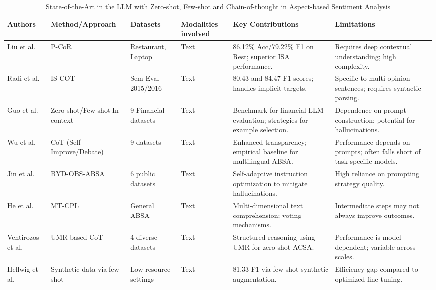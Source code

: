 \begin{landscape}
\begin{table}[p]
\centering
\caption{State-of-the-Art in the LLM with Zero-shot, Few-shot and Chain-of-thought in Aspect-based Sentiment Analysis}
\label{tab:llm-zero-few-cot-absa}
\small
\renewcommand{\arraystretch}{1.2}
\begin{tabularx}{\linewidth}{|p{1.8cm}|p{3cm}|p{3cm}|p{1.8cm}|X|X|}
\hline
Authors & Method/Approach & Datasets & Modalities involved & Key Contributions & Limitations \\ \hline
Liu et al.  \parencite{chang_liu_7bb298f7} & P-CoR & Restaurant, Laptop & Text & 86.12\% Acc/79.22\% F1 on Rest; superior ISA performance. & Requires deep contextual understanding; high complexity. \\ \hline
Radi et al.  \parencite{mohammad_radi_96ee5847} & IS-COT & Sem-Eval 2015/2016 & Text & 80.43 and 84.47 F1 scores; handles implicit targets. & Specific to multi-opinion sentences; requires syntactic parsing. \\ \hline
Guo et al.  \parencite{yue_guo_642efc19} & Zero-shot/Few-shot In-context & 9 Financial datasets & Text & Benchmark for financial LLM evaluation; strategies for example selection. & Dependence on prompt construction; potential for hallucinations. \\ \hline
Wu et al.  \parencite{chengyan_wu_4c659eab} & CoT (Self-Improve/Debate) & 9 datasets & Text & Enhanced transparency; empirical baseline for multilingual ABSA. & Performance depends on prompts; often falls short of task-specific models. \\ \hline
Jin et al.  \parencite{weiqiang_jin_5ccfa531} & BYD-OBS-ABSA & 6 public datasets & Text & Self-adaptive instruction optimization to mitigate hallucinations. & High reliance on prompting strategy quality. \\ \hline
He et al.  \parencite{yating_he_0bd5c04f} & MT-CPL & General ABSA & Text & Multi-dimensional text comprehension; voting mechanisms. & Intermediate steps may not always improve outcomes. \\ \hline
Ventirozos et al.  \parencite{filippos_ventirozos_5976f1ad} & UMR-based CoT & 4 diverse datasets & Text & Structured reasoning using UMR for zero-shot ACSA. & Performance is model-dependent; variable across scales. \\ \hline
Hellwig et al.  \parencite{nils_constantin_hellwig_6fa4e097} & Synthetic data via few-shot & Low-resource settings & Text & 81.33 F1 via few-shot synthetic augmentation. & Efficiency gap compared to optimized fine-tuning. \\ \hline

\end{tabularx}
\end{table}
\end{landscape}
